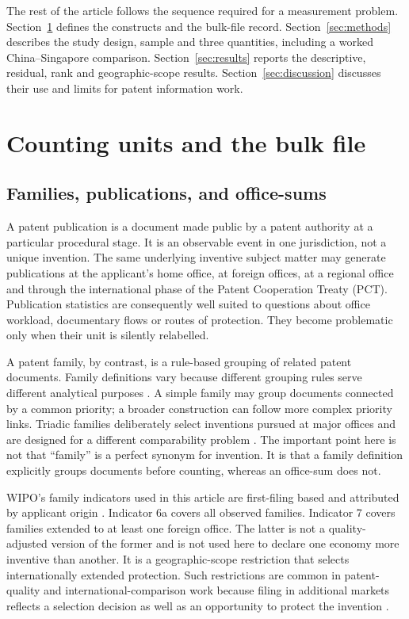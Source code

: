 \documentclass[a4paper,fleqn]{cas-dc}
\begin{document}
The rest of the article follows the sequence required for a measurement
problem. Section~\ref{sec:units} defines the constructs and the bulk-file
record. Section~\ref{sec:methods} describes the study design, sample and three
quantities, including a worked China--Singapore comparison.
Section~\ref{sec:results} reports the descriptive, residual, rank and
geographic-scope results.
Section~\ref{sec:discussion} discusses their use and limits for patent
information work.

\section{Counting units and the bulk file}\label{sec:units}

\subsection{Families, publications, and office-sums}\label{sec:families}

A patent publication is a document made public by a patent authority at a
particular procedural stage. It is an observable event in one jurisdiction,
not a unique invention. The same underlying inventive subject matter may
generate publications at the applicant's home office, at foreign offices, at
a regional office and through the international phase of the Patent
Cooperation Treaty (PCT). Publication statistics are consequently well suited
to questions about office workload, documentary flows or routes of protection.
They become problematic only when their unit is silently relabelled.

A patent family, by contrast, is a rule-based grouping of related patent
documents. Family definitions vary because different grouping rules serve
different analytical purposes \citep{martinez2010insight}. A simple family may
group documents connected by a common priority; a broader construction can
follow more complex priority links. Triadic families deliberately select
inventions pursued at major offices and are designed for a different
comparability problem \citep{dernis2004triadic}. The important point here is
not that ``family'' is a perfect synonym for invention. It is that a family
definition explicitly groups documents before counting, whereas an office-sum
does not.

WIPO's family indicators used in this article are first-filing based and
attributed by applicant origin \citep{wipo2026families}. Indicator 6a covers
all observed families. Indicator 7 covers families extended to at least one
foreign office. The latter is not a quality-adjusted version of the former and
is not used here to declare one economy more inventive than another. It is a
geographic-scope restriction that selects internationally extended protection.
Such restrictions are common in patent-quality and international-comparison
work because filing in additional markets reflects a selection decision as
well as an opportunity to protect the invention
\citep{squicciarini2013measuring,frietsch2010transnational,
dechezlepretre2017families}.
\end{document}
